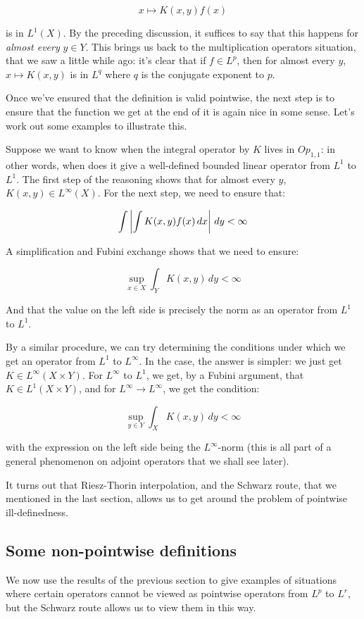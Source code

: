 \documentclass[a4paper]{amsart}
\begin{document}
$$x \mapsto K(x,y) f(x)$$

is in $L^1(X)$. By the preceding discussion, it suffices to say that
this happens for {\em almost every} $y \in Y$. This brings us back to
the multiplication operators situation, that we saw a little while
ago: it's clear that if $f \in L^p$, then for almost every $y$, $x
\mapsto K(x,y)$ is in $L^q$ where $q$ is the conjugate exponent to
$p$.

Once we've ensured that the definition is valid pointwise, the next
step is to ensure that the function we get at the end of it is again
nice in some sense. Let's work out some examples to illustrate this.

Suppose we want to know when the integral operator by $K$ lives in
$Op_{1,1}$: in other words, when does it give a well-defined bounded
linear operator from $L^1$ to $L^1$. The first step of the reasoning
shows that for almost every $y$, $K(x,y) \in L^\infty(X)$. For the
next step, we need to ensure that:

$$\int \left|\int K(x,y) f(x) \, dx \right| \, dy  <  \infty$$

A simplification and Fubini exchange shows that we need to ensure:

$$\sup_{x\in X} \int_Y K(x,y) \, dy < \infty$$

And that the value on the left side is precisely the norm as an
operator from $L^1$ to $L^1$.

By a similar procedure, we can try determining the conditions under
which we get an operator from $L^1$ to $L^\infty$. In the case, the
answer is simpler: we just get $K \in L^\infty(X \times Y)$. For
$L^\infty$ to $L^1$, we get, by a Fubini argument, that $K \in L^1(X
\times Y)$, and for $L^\infty \to L^\infty$, we get the condition:

$$\sup_{y \in Y} \int_X K(x,y) \, dy < \infty$$

with the expression on the left side being the $L^\infty$-norm (this
is all part of a general phenomenon on adjoint operators that we shall
see later).

It turns out that Riesz-Thorin interpolation, and the Schwarz route,
that we mentioned in the last section, allows us to get around the
problem of pointwise ill-definedness.
\subsection{Some non-pointwise definitions}

We now use the results of the previous section to give examples of
situations where certain operators cannot be viewed as pointwise
operators from $L^p$ to $L^r$, but the Schwarz route allows us to view
them in this way.
\end{document}
